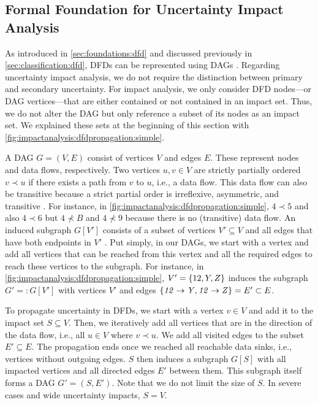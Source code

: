 \subsection{Formal Foundation for Uncertainty Impact Analysis}

As introduced in \autoref{sec:foundations:dfd} and discussed previously in \autoref{sec:classification:dfd}, \acp{DFD} can be represented using \acp{DAG} \cite{canfora_data_1992}.
Regarding uncertainty impact analysis, we do not require the distinction between primary and secondary uncertainty.
For impact analysis, we only consider \ac{DFD} nodes---or \ac{DAG} vertices---that are either contained or not contained in an impact set.
Thus, we do not alter the \ac{DAG} but only reference a subset of its nodes as an impact set.
We explained these sets at the beginning of this section with \autoref{fig:impactanalysis:dfdpropagation:simple}.

A \ac{DAG} $G = (V, E)$ consist of vertices $V$ and edges $E$.
These represent nodes and data flows, respectively.
Two vertices $u, v \in V$ are strictly partially ordered $v \prec u$ if there exists a path from $v$ to $u$, i.e., a data flow.
This data flow can also be transitive because a strict partial order is irreflexive, asymmetric, and transitive \cite{knuth_art_1997}.
For instance, in \autoref{fig:impactanalysis:dfdpropagation:simple}, $4 \prec 5$ and also $4 \prec 6$ but $4 \nprec B$ and $4 \nprec 9$ because there is no (transitive) data flow.
An induced subgraph $G[V']$ consists of a subset of vertices $V' \subseteq V$ and all edges that have both endpoints in $V'$ \cite{diestel_graph_2017}.
Put simply, in our \acp{DAG}, we start with a vertex and add all vertices that can be reached from this vertex and all the required edges to reach these vertices to the subgraph.
For instance, in \autoref{fig:impactanalysis:dfdpropagation:simple}, $V' = \{ 12, Y, Z \}$ induces the subgraph $G' =: G[V']$ with vertices $V'$ and edges $\{ \mathit{12} \rightarrow \mathit{Y}, \mathit{12} \rightarrow \mathit{Z} \} = E' \subset E$.

To propagate uncertainty in \acp{DFD}, we start with a vertex $v \in V$ and add it to the impact set $S \subseteq V$.
Then, we iteratively add all vertices that are in the direction of the data flow, i.e., all $u \in V$ where $v \prec u$.
We add all visited edges to the subset $E' \subseteq E$.
The propagation ends once we reached all reachable data sinks, i.e., vertices without outgoing edges.
$S$ then induces a subgraph $G[S]$ with all impacted vertices and all directed edges $E'$ between them.
This subgraph itself forms a \ac{DAG} $G' = (S,E')$.
Note that we do not limit the size of $S$.
In severe cases and wide uncertainty impacts, $S = V$.

